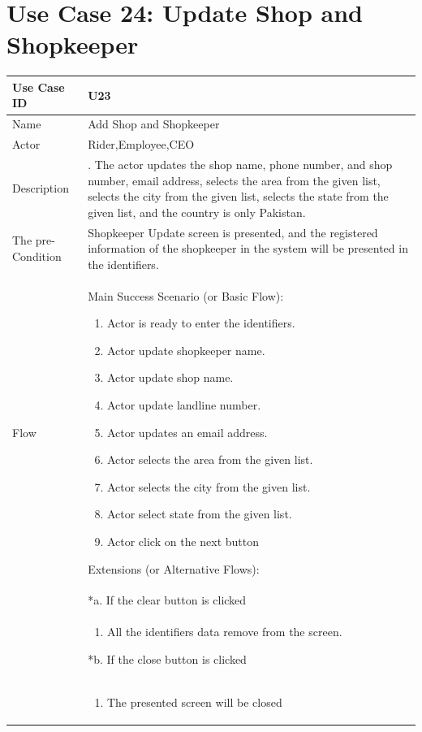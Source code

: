 \documentclass[12pt,a4paper]{report}
\begin{document}
\section{Use Case 24: Update Shop and Shopkeeper}
\begin{tabular}{ | m{3cm} | m{12cm}| } \hline
Use Case ID & U23   \\\hline
Name  &  Add Shop and Shopkeeper \\ \hline
Actor &   Rider,Employee,CEO\\ \hline
Description &. The actor updates the shop name, phone number, and shop number, email address, selects the area from the given list, selects the city from the given list, selects the state from the given list, and the country is only Pakistan. \\ \hline
The pre-Condition &  Shopkeeper Update screen is presented, and the registered information of the shopkeeper in the system will be presented in the identifiers.   \\\hline
Flow & Main Success Scenario (or Basic Flow):
\begin{enumerate}
\item Actor is ready to enter the identifiers.
\item Actor update shopkeeper name.   
\item Actor update shop name.   
\item Actor update landline number.
\item Actor updates an email address.
\item Actor selects the area from the given list.
\item Actor selects the city from the given list.
\item Actor select state from the given list.
\item  Actor click on the next button
\end{enumerate}
Extensions (or Alternative Flows):\\
& *a. If the clear button is clicked \\
& \begin{enumerate}
		\item All the identifiers data remove from the screen.
	\end{enumerate}
*b. If the close button is clicked\\
&	\begin{enumerate}
		\item The presented screen will be closed
	\end{enumerate}
\\\hline
\end{tabular}
\end{document}
